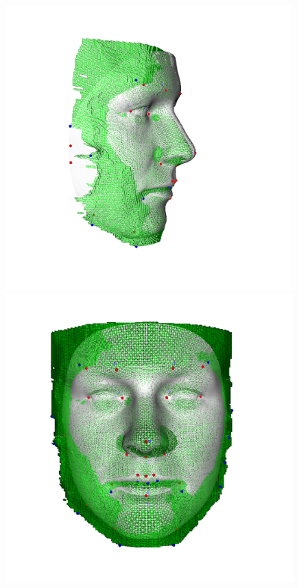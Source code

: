 \begin{figure}
  \centering  
  \begin{minipage}{.32\textwidth}
    \centering
    \includegraphics[width=0.98\textwidth]{Figures/Pictures/initLAlt_t.png}
  \end{minipage}
  \begin{minipage}{.32\textwidth}
    \centering
    \includegraphics[width=0.99\textwidth]{Figures/Pictures/initFAlt_t.png}

\end{minipage}
\end{figure}
